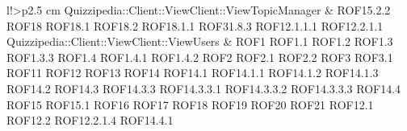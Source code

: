 \begin{tabella}{l!{\VRule}>{\centering\arraybackslash}p{2.5 cm}}
Quizzipedia::Client::ViewClient::ViewTopicManager & ROF15.2.2 \linebreak ROF18 \linebreak ROF18.1 \linebreak ROF18.2 \linebreak ROF18.1.1 \linebreak ROF31.8.3 \linebreak ROF12.1.1.1 \linebreak ROF12.2.1.1 \\
Quizzipedia::Client::ViewClient::ViewUsers & ROF1 \linebreak ROF1.1 \linebreak ROF1.2 \linebreak ROF1.3 \linebreak ROF1.3.3 \linebreak ROF1.4 \linebreak ROF1.4.1 \linebreak ROF1.4.2 \linebreak ROF2 \linebreak ROF2.1 \linebreak ROF2.2 \linebreak ROF3 \linebreak ROF3.1 \linebreak ROF11 \linebreak ROF12 \linebreak ROF13 \linebreak ROF14 \linebreak ROF14.1 \linebreak ROF14.1.1 \linebreak ROF14.1.2 \linebreak ROF14.1.3 \linebreak ROF14.2 \linebreak ROF14.3 \linebreak ROF14.3.3 \linebreak ROF14.3.3.1 \linebreak ROF14.3.3.2 \linebreak ROF14.3.3.3 \linebreak ROF14.4 \linebreak ROF15 \linebreak ROF15.1 \linebreak ROF16 \linebreak ROF17 \linebreak ROF18 \linebreak ROF19 \linebreak ROF20 \linebreak ROF21 \linebreak ROF12.1 \linebreak ROF12.2 \linebreak ROF12.2.1.4 \linebreak ROF14.4.1 \\

\end{tabella}
